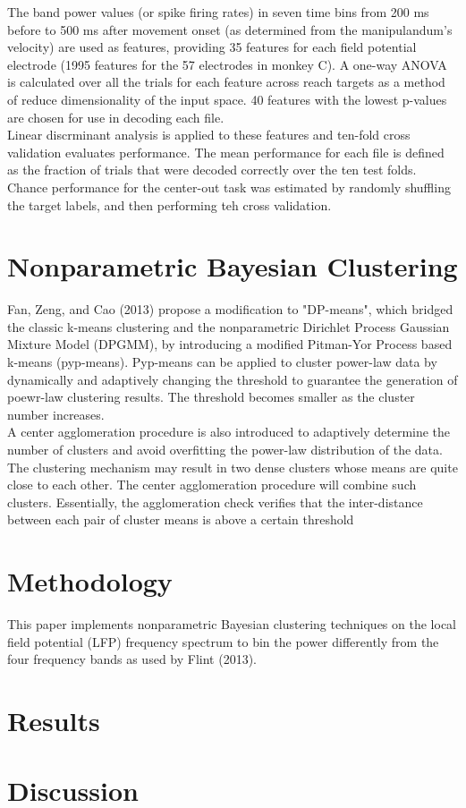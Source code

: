 \documentclass{article}
\begin{document}
\noindent
The band power values (or spike firing rates) in seven time bins from 200 ms before to 500 ms after movement onset (as determined from the manipulandum's velocity) are used as features, providing 35 features for each field potential electrode (1995 features for the 57 electrodes in monkey C).  A one-way ANOVA is calculated over all the trials for each feature across reach targets as a method of reduce dimensionality of the input space.  40 features with the lowest p-values are chosen for use in decoding each file.  \\

\noindent
Linear discrminant analysis is applied to these features and ten-fold cross validation evaluates performance.  The mean performance for each file is defined as the fraction of trials that were decoded correctly over the ten test folds.  Chance performance for the center-out task was estimated by randomly shuffling the target labels, and then performing teh cross validation.

\section{Nonparametric Bayesian Clustering}
\noindent
Fan, Zeng, and Cao (2013) propose a modification to "DP-means", which bridged the classic k-means clustering and the nonparametric Dirichlet Process Gaussian Mixture Model (DPGMM), by introducing a modified Pitman-Yor Process based k-means (pyp-means).  Pyp-means can be applied to cluster power-law data by dynamically and adaptively changing the threshold to guarantee the generation of poewr-law clustering results.  The threshold becomes smaller as the cluster number increases.  \\

\noindent
A center agglomeration procedure is also introduced to adaptively determine the number of clusters and avoid overfitting the power-law distribution of the data.  The clustering mechanism may result in two dense clusters whose means are quite close to each other.  The center agglomeration procedure will combine such clusters.  Essentially, the agglomeration check verifies that the inter-distance between each pair of cluster means is above a certain threshold 


\section{Methodology}
This paper implements nonparametric Bayesian clustering techniques on the local field potential (LFP) frequency spectrum to bin the power differently from the four frequency bands as used by Flint (2013).  



\section{Results}

\section{Discussion}
\end{document}
